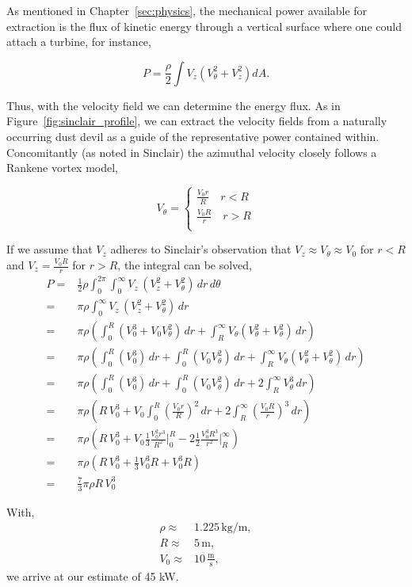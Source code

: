 \label{scaling}

As mentioned in Chapter~\ref{sec:physics}, the mechanical power
available for extraction is the flux of kinetic energy through a
vertical surface where one could attach a turbine, for instance, 

\begin{equation}
 P = \frac{\rho }{2} \int V_z (V_{\theta}^2 + V_z^2 ) dA. 
\end{equation}

Thus, with the velocity field we can determine the energy
flux. As in Figure~\ref{fig:sinclair_profile}, we can extract the
velocity fields from a naturally occurring dust devil as a guide of the 
representative power contained within. Concomitantly (as noted in
Sinclair) the azimuthal velocity closely follows a Rankene vortex model,   

\begin{equation}
 V_{\theta} = 
  \begin{cases}
   \frac{V_0 r}{R} \quad r < R \\
   \frac{V_0 R}{r} \quad r > R \\
  \end{cases}
\end{equation}

If we assume that $V_z$ adheres to Sinclair's observation that $V_z \approx
V_{\theta} \approx V_0$ for $r < R$ and $V_z=\frac{V_0 R}{r}$ for $r > R$,
the integral can be solved, 
\begin{eqnarray}
 P =& \frac{1}{2} \rho \int_0^{2\pi}\int_0^{\infty} V_z \, (V^2_z +
  V_{\theta}^2)\, dr \, d\theta \\ 
 =& \pi \rho \int_0^{\infty} V_z \, (V^2_z + V_{\theta}^2)\, dr \\
 =& \pi \rho \left( \int_0^R (V_0^3 + V_0 V_{\theta}^2)\,dr +
	      \int_R^{\infty} V_{\theta} (V_{\theta}^2 + V_{\theta}^2)\,dr 
	     \right) \\
 =& \pi \rho \left( \int_0^R (V_0^3)\, dr + \int_0^R (V_0 V_{\theta}^2)\,dr +
	      \int_R^{\infty} V_{\theta} (V_{\theta}^2 + V_{\theta}^2) \,dr 
		     \right) \\
 =& \pi \rho \left( \int_0^R (V_0^3)\, dr + \int_0^R (V_0 V_{\theta}^2)\,dr +
	      2 \int_R^{\infty} V_{\theta}^3 \,dr 
		     \right) \\
 =& \pi \rho \left( R\, V_0^3 + V_0 \int_0^R (\frac{V_0 r}{R})^2\,dr +
	      2 \int_R^{\infty} (\frac{V_0 R}{r})^3 \,dr 
		     \right) \\
 =& \pi \rho \left( R\, V_0^3 + V_0 \frac{1}{3} \frac{V_0^2 r^3}{R^2}\rvert_0^R -
	      2 \frac{1}{2} \frac{V_0^3 R^3}{r^2}\rvert_R^{\infty}
		      \right) \\
 =& \pi \rho \left( R\, V_0^3 + \frac{1}{3} V_0^3 R + V_0^3 R \right)\\
 =& \frac{7}{3}\pi \rho R\, V_0^3
\end{eqnarray}

%
%

With, 
\begin{eqnarray}
 \rho \approx& 1.225 \,\text{kg}/\text{m}, \\
 R \approx& 5 \,\text{m}, \\
 V_0 \approx& 10 \,\frac{\text{m}}{\text{s}},
\end{eqnarray}
we arrive at our estimate of 45 kW.

%
%